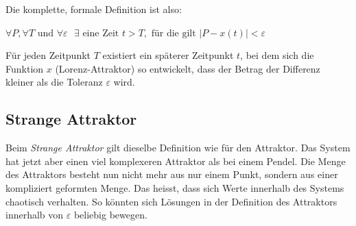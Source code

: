 Die komplette, formale Definition ist also:

\begin{center}\label{Attraktor}
$\forall P, \forall T \text{ und } \forall \varepsilon \text{ } \exists \text{ eine Zeit }t > T , \text{ für die gilt } |P - x(t) |< \varepsilon$
\end{center}

Für jeden Zeitpunkt $T$ existiert ein späterer Zeitpunkt $t$, bei dem sich die Funktion $x$ (Lorenz-Attraktor) so entwickelt, dass der Betrag der Differenz kleiner als die Toleranz $\varepsilon$ wird. 


\subsection{Strange Attraktor}
%
Beim {\em Strange Attraktor} gilt dieselbe Definition wie für den Attraktor. Das System hat jetzt aber einen viel komplexeren Attraktor als bei einem Pendel. Die Menge des Attraktors besteht nun nicht mehr aus nur einem Punkt, sondern aus einer kompliziert geformten Menge. Das heisst, dass sich Werte innerhalb des Systems chaotisch verhalten. So könnten sich Lösungen in der Definition des Attraktors innerhalb von $\varepsilon$ beliebig bewegen. 
